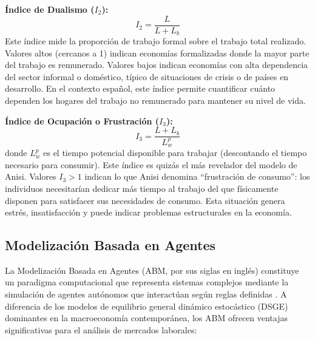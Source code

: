 \textbf{Índice de Dualismo ($I_2$):}
\begin{equation}
I_2 = \frac{L}{L + L_b}
\end{equation}
Este índice mide la proporción de trabajo formal sobre el trabajo total realizado. Valores altos (cercanos a 1) indican economías formalizadas donde la mayor parte del trabajo es remunerado. Valores bajos indican economías con alta dependencia del sector informal o doméstico, típico de situaciones de crisis o de países en desarrollo. En el contexto español, este índice permite cuantificar cuánto dependen los hogares del trabajo no remunerado para mantener su nivel de vida.

\textbf{Índice de Ocupación o Frustración ($I_3$):}
\begin{equation}
I_3 = \frac{L + L_b}{L_w^p}
\end{equation}
donde $L_w^p$ es el tiempo potencial disponible para trabajar (descontando el tiempo necesario para consumir). Este índice es quizás el más revelador del modelo de Anisi. Valores $I_3 > 1$ indican lo que Anisi denomina ``frustración de consumo'': los individuos necesitarían dedicar más tiempo al trabajo del que físicamente disponen para satisfacer sus necesidades de consumo. Esta situación genera estrés, insatisfacción y puede indicar problemas estructurales en la economía.

\subsection{Modelización Basada en Agentes}

La Modelización Basada en Agentes (ABM, por sus siglas en inglés) constituye un paradigma computacional que representa sistemas complejos mediante la simulación de agentes autónomos que interactúan según reglas definidas \cite{tesfatsion2006agent, bonabeau2002}. A diferencia de los modelos de equilibrio general dinámico estocástico (DSGE) dominantes en la macroeconomía contemporánea, los ABM ofrecen ventajas significativas para el análisis de mercados laborales:

